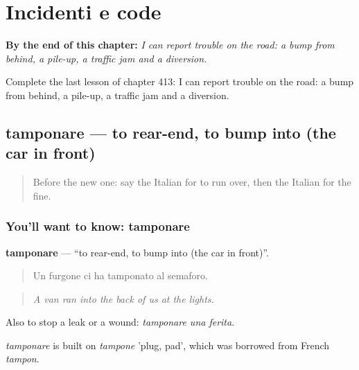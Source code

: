 
\chapter{Incidenti e code}
\label{ch:it-incidenti-e-code}

\begin{chapteropening}
\textbf{By the end of this chapter:} \emph{I can report trouble on the road: a bump from behind, a pile-up, a traffic jam and a diversion.}

Complete the last lesson of chapter 413: I can report trouble on the road: a bump from behind, a pile-up, a traffic jam and a diversion.
\end{chapteropening}

\section[tamponare]{tamponare — to rear-end, to bump into (the car in front)}

\label{lesson:IT-C413-tamponare}



\begin{quote}
Before the new one: say the Italian for to run over, then the Italian for the fine.
\end{quote}

\subsection*{You'll want to know: tamponare}
\textbf{tamponare} — \textquotedblleft{}to rear-end, to bump into (the car in front)\textquotedblright{}.

\begin{quote}
Un furgone ci ha tamponato al semaforo.
\end{quote}

\begin{quote}
\emph{A van ran into the back of us at the lights.}
\end{quote}

Also to stop a leak or a wound: \emph{tamponare una ferita}.

\begin{cousinweb}
\emph{tamponare} is built on \emph{tampone} 'plug, pad', which was borrowed from French \emph{tampon}.
\end{cousinweb}

